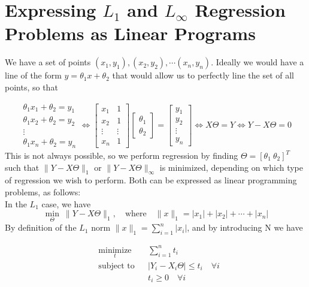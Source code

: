 \documentclass{article}
\begin{document}



\section*{Expressing $L_1$ and $L_\infty$ Regression Problems as Linear Programs}
We have a set of points $(x_1, y_1), (x_2, y_2), \cdots (x_n, y_n)$. Ideally we would have a line of the form $y = \theta_1 x + \theta_2$ that would allow us to perfectly line the set of all points, so that 



$$ \begin{matrix} \theta_1  x_1 +\theta_2 = y_1 \\ \theta_1x_2+\theta_2 = y_2 \\ \vdots \\ \theta_1x_n + \theta_2 = y_n\end{matrix} \iff \begin{bmatrix} x_1 & 1 \\ x_2 & 1 \\ \vdots & \vdots \\ x_n & 1 \end{bmatrix} \begin{bmatrix} \theta_1 \\ \theta_2 \end{bmatrix}  = \begin{bmatrix} y_1 \\ y_2 \\ \vdots \\ y_n\end{bmatrix} \iff X\Theta =Y \iff Y-X\Theta = 0$$
This is not always possible, so we perform regression by finding $\Theta = [\theta_1 \ \theta_2]^T$ such that $\lVert Y-X\Theta  \rVert_1$  or $\lVert Y-X\Theta  \rVert_\infty $ is minimized, depending on which type of regression we wish to perform. Both can be expressed as linear programming problems, as follows:\\


In the $L_1$ case, we have  	
$$ \min_\Theta  \  \lVert Y - X \Theta \rVert_1, \quad \text{where} \quad \lVert x \rVert_1 = |x_1| + |x_2| + \cdots + |x_n| $$
By definition of the $L_1$ norm $\lVert x \rVert_1 = \sum_{i=1}^n |x_i|$, and by introducing N we have

\begin{equation*}
\begin{aligned}
& \underset{t}{\text{minimize}}
& & \sum_{i=1}^n t_i \\
& \text{subject to}
& & |Y_i - X_i \Theta |\leq t_i \quad \forall i\\
&&& t_i \geq 0  \quad \forall i  \\
\end{aligned}
\end{equation*}
\end{document}
